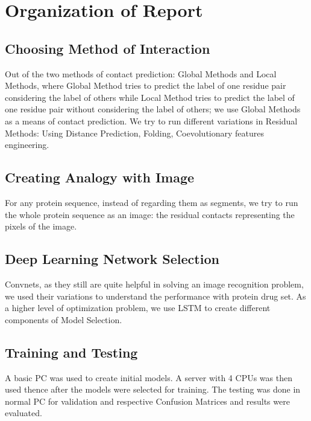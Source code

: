 \section{Organization of Report}

\subsection{Choosing Method of Interaction}
Out of the two methods of contact prediction: Global Methods and Local Methods, where Global Method tries to predict the label of one residue pair considering the label of others while Local Method tries to predict the label of one residue pair without considering the label of others; we use Global Methods as a means of contact prediction. We try to run different variations in Residual Methods: Using Distance Prediction, Folding, Coevolutionary features engineering. 

\subsection{Creating Analogy with Image}
For any protein sequence, instead of regarding them as segments, we try to run the whole protein sequence as an image: the residual contacts representing the pixels of the image.

\subsection{Deep Learning Network Selection}
Convnets, as they still are quite helpful in solving an image recognition problem, we used their variations to understand the performance with protein drug set. As a higher level of optimization problem, we use LSTM to create different components of Model Selection. 

\subsection{Training and Testing}
A basic PC was used to create initial models. A server with 4 CPUs was then used thence after the models were selected for training. The testing was done in normal PC for validation and respective Confusion Matrices and results were evaluated.
